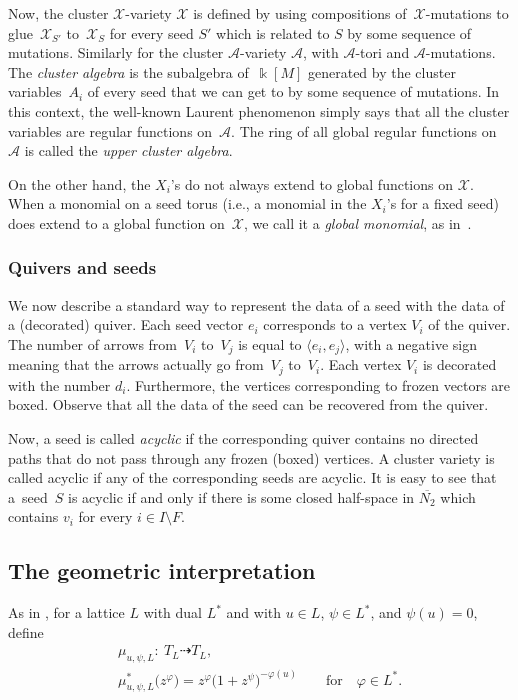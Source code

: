 \documentclass[pdftex]{sigma}
\numberwithin{equation}{section}
\numberwithin{figure}{section}
\numberwithin{table}{section}
\let\?=\overline
\let\s=\mathcal
\newcommand {\kk} {\Bbbk}
\theoremstyle{definition}
\begin{document}
Now, the cluster $\s{X}$-variety $\s{X}$ is defined by using compositions of~$\s{X}$-mutations to glue~$\s{X}_{S'}$ to~$\s{X}_S$ for every seed $S'$ which is related to $S$ by some sequence of mutations. Similarly for the cluster $\s{A}$-variety $\s{A}$, with $\s{A}$-tori and $\s{A}$-mutations. The {\it cluster algebra} is the subalgebra of~$\kk[M]$ generated by the cluster variables~$A_i$ of every seed that we can get to by some sequence of mutations. In this context, the well-known Laurent phenomenon simply says that all the cluster variables are regular functions on~$\s{A}$. The ring of all global regular functions on~$\s{A}$ is called the {\it upper cluster algebra}.

On the other hand, the $X_i$'s do not always extend to global functions on $\s{X}$. When a monomial on a seed torus (i.e., a monomial in the $X_i$'s for a fixed seed) does extend to a global function on~$\s{X}$, we call it a {\it global monomial}, as in~\cite{GHK3}.

\subsubsection{Quivers and seeds}\label{quivers}

We now describe a standard way to represent the data of a seed with the data of a (decorated) quiver. Each seed vector $e_i$ corresponds to a vertex $V_i$ of the quiver. The number of arrows from~$V_i$ to~$V_j$ is equal to $\langle e_i , e_j\rangle$, with a negative sign meaning that the arrows actually go from~$V_j$ to~$V_i$. Each vertex $V_i$ is decorated with the number $d_i$. Furthermore, the vertices corresponding to frozen vectors are boxed. Observe that all the data of the seed can be recovered from the quiver.

Now, a seed is called {\it acyclic} if the corresponding quiver contains no directed paths that do not pass through any frozen (boxed) vertices. A cluster variety is called acyclic if any of the corresponding seeds are acyclic. It is easy to see that a~seed~$S$ is acyclic if and only if there is some closed half-space in $\?{N_2}$ which contains $v_i$ for every $i\in I\setminus F$.

\subsection{The geometric interpretation}\label{geom int}

As in \cite{GHK3}, for a lattice $L$ with dual $L^*$ and with $u \in L$, $\psi \in L^*$, and $\psi(u)=0$, define
\begin{gather*}
	\mu_{u,\psi,L}\colon \ T_L \dashrightarrow T_L, \\
	\mu_{u,\psi,L}^*\big(z^{\varphi}\big) = z^\varphi\big(1+z^{\psi}\big)^{-\varphi(u)} \qquad \text{for} \quad \varphi\in L^*.
\end{gather*}
\end{document}

